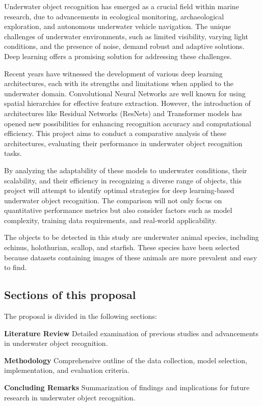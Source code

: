 Underwater object recognition has emerged as a crucial field within marine
research, due to advancements in ecological monitoring, archaeological
exploration, and autonomous underwater vehicle navigation.
The unique challenges of underwater environments, such as limited visibility,
varying light conditions, and the presence of noise, demand robust and adaptive
solutions.
Deep learning offers a promising solution for addressing these challenges.

Recent years have witnessed the development of various deep learning
architectures, each with its strengths and limitations when applied to the
underwater domain.
Convolutional Neural Networks are well known for
using spatial hierarchies for effective feature extraction.
However, the introduction of architectures like Residual Networks (ResNets)
and Transformer models has opened new possibilities for enhancing recognition
accuracy and computational efficiency.
This project aims to conduct a comparative analysis of these architectures,
evaluating their performance in underwater object recognition tasks.

By analyzing the adaptability of these models to underwater conditions,
their scalability, and their efficiency in recognizing a diverse range of
objects, this project will attempt to identify optimal strategies
for deep learning-based underwater object recognition.
The comparison will not only focus on quantitative performance metrics but also
consider factors such as model complexity, training data requirements, and real-world applicability.

The objects to be detected in this study are underwater animal species,
including echinus, holothurian, scallop, and starfish.
These species have been selected because datasets containing images of
these animals are more prevalent and easy to find.

\subsection{Sections of this proposal}

The proposal is divided in the following sections:

\begin{APAitemize}
    \item \textbf{Literature Review} Detailed examination of previous studies and advancements in underwater object recognition.
    \item \textbf{Methodology} Comprehensive outline of the data collection, model selection, implementation, and evaluation criteria.
    \item \textbf{Concluding Remarks} Summarization of findings and implications for future research in underwater object recognition.
\end{APAitemize}
